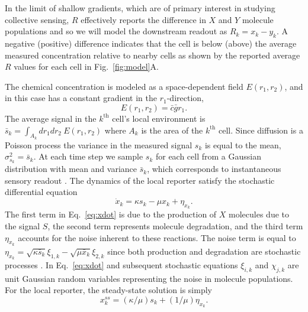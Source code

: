 In the limit of shallow gradients, which are of primary interest in studying collective sensing, $R$ effectively reports the difference in $X$ and $Y$ molecule populations \cite{ellison2016cell} and so we will model the downstream readout as $R_k = x_k-y_k$. A negative (positive) difference indicates that the cell is below (above) the average measured concentration relative to nearby cells as shown by the reported average $R$ values for each cell in Fig.\ \ref{fig:model}A.

The chemical concentration is modeled as a space-dependent field $E(r_1,r_2)$, and in this case has a constant gradient in the $r_1$-direction,
\begin{equation*}
    E(r_1,r_2) = \bar{c} \bar{g}r_1.
\end{equation*}
The average signal in the $k^\text{th}$ cell's local environment is $\bar{s}_k = \int_{A_k} dr_1 dr_2 \ E(r_1,r_2)$ where $A_k$ is the area of the $k^\text{th}$ cell. Since diffusion is a Poisson process the variance in the measured signal $s_k$ is equal to the mean, $\sigma_{s_k}^2 = \bar{s}_k$. At each time step we sample $s_k$ for each cell from a Gaussian distribution with mean and variance $\bar{s}_k$, which corresponds to instantaneous sensory readout \cite{ellison2016cell}. The dynamics of the local reporter satisfy the stochastic differential equation
\begin{equation} \label{eq:xdot}
    \dot{x}_k = \kappa s_k - \mu x_k + \eta_{x_k}.
\end{equation}
The first term in Eq.\ \ref{eq:xdot} is due to the production of $X$ molecules due to the signal $S$, the second term represents molecule degradation, and the third term $\eta_{x_k}$ accounts for the noise inherent to these reactions. The noise term is equal to
$\eta_{x_k} = \sqrt{\kappa\bar{s}_k}\xi_{1,k} - \sqrt{\mu \bar{x}_k} \xi_{2,k}$ since both production and degradation are stochastic processes \cite{gillespie2000chemical}.
In Eq.\ \ref{eq:xdot} and subsequent stochastic equations $\xi_{i,k}$ and $\chi_{j,k}$ are unit Gaussian random variables representing the noise in molecule populations. For the local reporter, the steady-state solution is simply
\begin{equation} \label{eq:xss}
    x_{k}^{ss} = \left( \kappa/\mu \right) s_k + \left( 1/\mu \right) \eta_{x_k}.
\end{equation}


